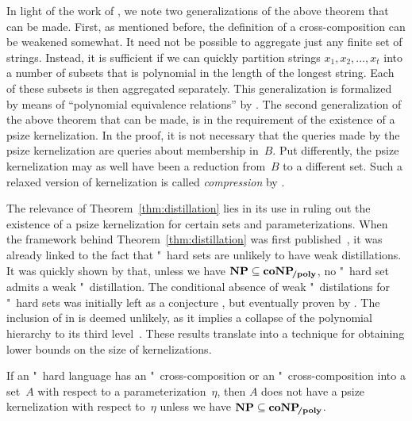 In light of the work of \textcite{bodlaender2014kernelization}, we note two generalizations of the above theorem that can be made.
First, as mentioned before, the definition of a cross-composition can be weakened somewhat.
It need not be possible to aggregate just any finite set of strings.
Instead, it is sufficient if we can quickly partition strings $x_1, x_2, \ldots, x_t$ into a number of subsets that is polynomial in the length of the longest string.
Each of these subsets is then aggregated separately.
This generalization is formalized by means of \enquote{polynomial equivalence relations} by \textcite{bodlaender2014kernelization}.
The second generalization of the above theorem that can be made, is in the requirement of the existence of a psize kernelization.
In the proof, it is not necessary that the queries made by the psize kernelization are queries about membership in~$B$.
Put differently, the psize kernelization may as well have been a reduction from~$B$ to a different set.
Such a relaxed version of kernelization is called \emph{compression} by \textcite{bodlaender2014kernelization}.

The relevance of Theorem~\ref{thm:distillation} lies in its use in ruling out the existence of a psize kernelization for certain sets and parameterizations.
When the framework behind Theorem~\ref{thm:distillation} was first published~\parencite{bodlaender2009problems}, it was already linked to the fact that "~hard sets are unlikely to have weak distillations.
It was quickly shown by \textcite{fortnow2011infeasibility} that, unless we have $\textnormal{\textbf{NP}} \subseteq \textnormal{\textbf{coNP}}\!_\textnormal{\textbf{/poly}}$, no "~hard set admits a weak "~distillation.
The conditional absence of weak "~distilations for "~hard sets was initially left as a conjecture \parencite{bodlaender2009problems}, but eventually proven by \textcite{drucker2015new}.
The inclusion of  in  is deemed unlikely, as it implies a collapse of the polynomial hierarchy to its third level~\parencite{yap1983some}.
These results translate into a technique for obtaining lower bounds on the size of kernelizations.
\begin{corollary}
\label{cor:lower_bound}%
  If an "~hard language has an "~cross-composition or an "~cross-composition into a set~$A$ with respect to a parameterization~$\eta$, then $A$ does not have a psize kernelization with respect to~$\eta$ unless we have $\textnormal{\textbf{NP}} \subseteq \textnormal{\textbf{coNP}}\!_\textnormal{\textbf{/poly}}$.
\end{corollary}

